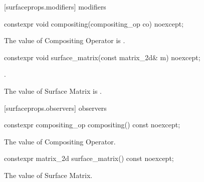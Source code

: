  [surfaceprops.modifiers] { modifiers}

\begin{itemdecl}
constexpr void compositing(compositing_op co) noexcept;
\end{itemdecl}
\begin{itemdescr}
\pnum
\effects
The value of Compositing Operator is .
\end{itemdescr}

\begin{itemdecl}
constexpr void surface_matrix(const matrix_2d& m) noexcept;
\end{itemdecl}
\begin{itemdescr}
\pnum
\requires
{}.

\pnum
\effects
The value of Surface Matrix is .
\end{itemdescr}

 [surfaceprops.observers] { observers}

\begin{itemdecl}
constexpr compositing_op compositing() const noexcept;
\end{itemdecl}
\begin{itemdescr}
\pnum
\returns
The value of Compositing Operator.
\end{itemdescr}

\begin{itemdecl}
constexpr matrix_2d surface_matrix() const noexcept;
\end{itemdecl}
\begin{itemdescr}
\pnum
\returns
The value of Surface Matrix.
\end{itemdescr}

